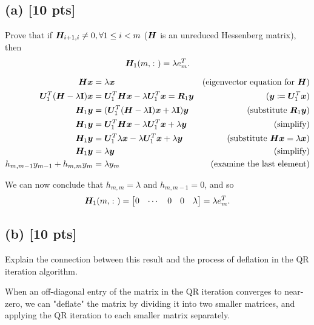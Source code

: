 \documentclass[twoside,10pt]{article}
\begin{document}
\subsection*{(a) [10 pts]}
Prove that if $\bm{H}_{i + 1, i} \neq  0, \forall 1 \leq i < m$ ($\bm{H}$ is an unreduced Hessenberg matrix), then 
\begin{equation}
  \mtx{H}_1\left(m, \colon\right) = \lambda e_m^{T}. 
\end{equation}

\begin{align*}
  \bm{H} \bm{x} &= \lambda \bm{x}&\text{(eigenvector equation for $\bm{H}$)}\\
  \bm{U}_1^T (\bm{H} - \lambda \mathbf{I}) \bm{x} &= \bm{U}_1^T \bm{H} \bm{x} - \lambda \bm{U}_1^T \bm{x} = \bm{R}_1 \bm{y}&\text{($\bm{y} \coloneqq \bm{U}_1^T \bm{x}$)}\\
  \bm{H}_1 \bm{y} &= (\bm{U}_1^T (\bm{H} - \lambda \mathbf{I}) \bm{x} + \lambda \mathbf{I}) \bm{y}&\text{(substitute $\bm{R}_1 \bm{y}$)}\\
  \bm{H}_1 \bm{y} &= \bm{U}_1^T \bm{H} \bm{x} - \lambda \bm{U}_1^T \bm{x} + \lambda \bm{y}&\text{(simplify)}\\
  \bm{H}_1 \bm{y} &= \bm{U}_1^T \lambda \bm{x} - \lambda \bm{U}_1^T \bm{x} + \lambda \bm{y}&\text{(substitute $\bm{H} \bm{x} = \lambda \bm{x}$)}\\
  \bm{H}_1 \bm{y} &= \lambda \bm{y}&\text{(simplify)}\\
  h_{m,m-1} y_{m-1} + h_{m,m} y_m &= \lambda y_m&\text{(examine the last element)}
\end{align*}

We can now conclude that $h_{m,m} = \lambda$ and $h_{m,m-1} = 0$, and so
$$\mtx{H}_1\left(m, \colon\right) = \begin{bmatrix} 0 & \cdots & 0 & 0 & \lambda \end{bmatrix} = \lambda e_m^{T}.$$

\subsection*{(b) [10 pts]}
Explain the connection between this result and the process of deflation in the QR iteration algorithm. 

\quad When an off-diagonal entry of the matrix in the QR iteration converges to near-zero, we can "deflate" the matrix by dividing it into two smaller matrices, and applying the QR iteration to each smaller matrix separately.
\end{document}
